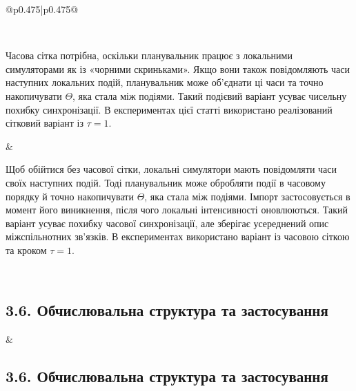 \documentclass[11pt]{article}
\begin{document}
\begin{longtable}{@{}p{0.475\textwidth}|p{0.475\textwidth}@{}}
\begin{minipage}[t]{\linewidth}
\end{minipage} \\[5mm]
\begin{minipage}[t]{\linewidth}
Часова сітка потрібна, оскільки планувальник працює з локальними симуляторами як із «чорними скриньками». Якщо вони також повідомляють часи наступних локальних подій, планувальник може об'єднати ці часи та точно накопичувати $\Theta$, яка стала між подіями. Такий подієвий варіант усуває чисельну похибку синхронізації. В експериментах цієї статті використано реалізований сітковий варіант із $\tau=1$.
\end{minipage} &
\begin{minipage}[t]{\linewidth}
Щоб обійтися без часової сітки, локальні симулятори мають повідомляти часи своїх наступних подій. Тоді планувальник може обробляти події в часовому порядку й точно накопичувати $\Theta$, яка стала між подіями. Імпорт застосовується в момент його виникнення, після чого локальні інтенсивності оновлюються. Такий варіант усуває похибку часової синхронізації, але зберігає усереднений опис міжспільнотних зв'язків. В експериментах використано варіант із часовою сіткою та кроком $\tau=1$.
\end{minipage} \\[5mm]
\begin{minipage}[t]{\linewidth}
\subsection*{3.6. Обчислювальна структура та застосування}

\end{minipage} &
\begin{minipage}[t]{\linewidth}
\subsection*{3.6. Обчислювальна структура та застосування}


\end{minipage}
\end{longtable}
\end{document}
